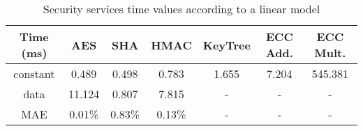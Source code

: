 \begin{table}[h!]
\centering
\def\arraystretch{1.5}
\begin{tabular}{|c|c|c|c|c|c|c|}
\hline
	Time (ms)   & AES     & SHA    & HMAC    & KeyTree & ECC Add. & ECC Mult.   \\ \hline
constant  & 0.489  & 0.498  & 0.783   & 1.655   & 7.204   & 545.381 \\ \hline
data  & 11.124  & 0.807 & 7.815   & -       & -       & -      \\ \hline
MAE 	   & 0.01\%  & 0.83\%  & 0.13\%   & -	  & -	    & -   \\ \hline
\end{tabular}
\caption{Security services time values according to a linear model}
\label{tab:core-model}
\end{table}
